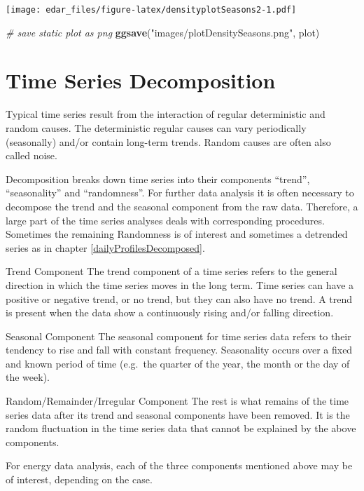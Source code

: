 \documentclass[
  a4paperpaper,
]{book}
\newenvironment{Shaded}{\begin{snugshade}}{\end{snugshade}}
\newcommand{\CommentTok}[1]{\textcolor[rgb]{0.56,0.35,0.01}{\textit{#1}}}
\newcommand{\KeywordTok}[1]{\textcolor[rgb]{0.13,0.29,0.53}{\textbf{#1}}}
\newcommand{\NormalTok}[1]{#1}
\newcommand{\StringTok}[1]{\textcolor[rgb]{0.31,0.60,0.02}{#1}}
\let\oldShaded\Shaded
\let\endoldShaded\endShaded
\renewenvironment{Shaded}{\footnotesize\oldShaded}{\endoldShaded}
\begin{document}
\texttt{[image: edar\_files/figure-latex/densityplotSeasons2-1.pdf]}

\begin{Shaded}
\begin{Highlighting}[]
\CommentTok{# save static plot as png}
\KeywordTok{ggsave}\NormalTok{(}\StringTok{"images/plotDensitySeasons.png"}\NormalTok{, plot)}
\end{Highlighting}
\end{Shaded}

\hypertarget{time-series-decomposition}{%
\chapter{Time Series Decomposition}\label{time-series-decomposition}}

Typical time series result from the interaction of regular deterministic and random causes. The deterministic regular causes can vary periodically (seasonally) and/or contain long-term trends. Random causes are often also called noise.

Decomposition breaks down time series into their components ``trend'', ``seasonality'' and ``randomness''. For further data analysis it is often necessary to decompose the trend and the seasonal component from the raw data. Therefore, a large part of the time series analyses deals with corresponding procedures. Sometimes the remaining Randomness is of interest and sometimes a detrended series as in chapter \ref{dailyProfilesDecomposed}.

Trend Component
The trend component of a time series refers to the general direction in which the time series moves in the long term. Time series can have a positive or negative trend, or no trend, but they can also have no trend. A trend is present when the data show a continuously rising and/or falling direction.

Seasonal Component
The seasonal component for time series data refers to their tendency to rise and fall with constant frequency. Seasonality occurs over a fixed and known period of time (e.g.~the quarter of the year, the month or the day of the week).

Random/Remainder/Irregular Component
The rest is what remains of the time series data after its trend and seasonal components have been removed. It is the random fluctuation in the time series data that cannot be explained by the above components.

For energy data analysis, each of the three components mentioned above may be of interest, depending on the case.
\end{document}
